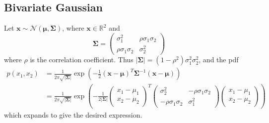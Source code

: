 \subsection{Bivariate Gaussian}
Let $\bm{x} \sim \mathcal{N}(\bm{\mu}, \bm{\Sigma})$, where $\bm{x} \in \mathbb{R}^2$ and
\begin{equation*}
\bm{\Sigma} = \begin{pmatrix} \sigma_1^2 & \rho\sigma_1\sigma_2 \\ \rho\sigma_1\sigma_2 & \sigma_2^2 \end{pmatrix}
\end{equation*}
where $\rho$ is the correlation coefficient. Thus $|\bm{\Sigma}| = (1-\rho^2)\sigma_1^2\sigma_2^2$, and the pdf
\begin{align*}
p(x_1,x_2) &= \frac{1}{2\pi\sqrt{|\bm{\Sigma}|}} \exp(-\frac{1}{2} (\bm{x}-\bm{\mu})^T \bm{\Sigma}^{-1} (\bm{x}-\bm{\mu}))\\
&= \frac{1}{2\pi\sqrt{|\bm{\Sigma}|}} \exp\left( -\frac{1}{2|\bm{\Sigma}|} \begin{pmatrix}x_1-\mu_1\\x_2-\mu_2\end{pmatrix}^T \begin{pmatrix}\sigma_2^2&-\rho\sigma_1\sigma_2\\-\rho\sigma_1\sigma_2&\sigma_1^2\end{pmatrix} \begin{pmatrix}x_1-\mu_1\\x_2-\mu_2\end{pmatrix} \right)
\end{align*}
which expands to give the desired expression.

